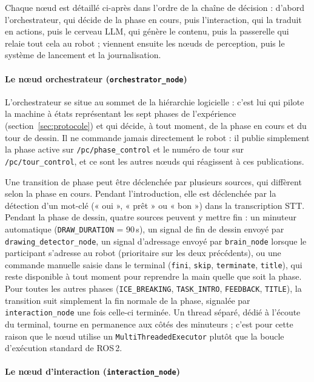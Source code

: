 \documentclass[11pt]{article}
\begin{document}
Chaque nœud est détaillé ci-après dans l'ordre de la chaîne de décision : d'abord l'orchestrateur, qui décide de la phase en cours, puis l'interaction, qui la traduit en actions, puis le cerveau LLM, qui génère le contenu, puis la passerelle qui relaie tout cela au robot ; viennent ensuite les nœuds de perception, puis le système de lancement et la journalisation.

\paragraph{Le nœud orchestrateur (\texttt{orchestrator\_node})}

L'orchestrateur se situe au sommet de la hiérarchie logicielle : c'est lui qui pilote la machine à états représentant les sept phases de l'expérience (section~\ref{sec:protocole}) et qui décide, à tout moment, de la phase en cours et du tour de dessin. Il ne commande jamais directement le robot : il publie simplement la phase active sur \texttt{/pc/phase\_control} et le numéro de tour sur \texttt{/pc/tour\_control}, et ce sont les autres nœuds qui réagissent à ces publications.

Une transition de phase peut être déclenchée par plusieurs sources, qui diffèrent selon la phase en cours. Pendant l'introduction, elle est déclenchée par la détection d'un mot-clé (« oui », « prêt » ou « bon ») dans la transcription STT. Pendant la phase de dessin, quatre sources peuvent y mettre fin : un minuteur automatique (\texttt{DRAW\_DURATION} = 90\,s), un signal de fin de dessin envoyé par \texttt{drawing\_detector\_node}, un signal d'adressage envoyé par \texttt{brain\_node} lorsque le participant s'adresse au robot (prioritaire sur les deux précédents), ou une commande manuelle saisie dans le terminal (\texttt{fini}, \texttt{skip}, \texttt{terminate}, \texttt{title}), qui reste disponible à tout moment pour reprendre la main quelle que soit la phase. Pour toutes les autres phases (\texttt{ICE\_BREAKING}, \texttt{TASK\_INTRO}, \texttt{FEEDBACK}, \texttt{TITLE}), la transition suit simplement la fin normale de la phase, signalée par \texttt{interaction\_node} une fois celle-ci terminée. Un thread séparé, dédié à l'écoute du terminal, tourne en permanence aux côtés des minuteurs ; c'est pour cette raison que le nœud utilise un \texttt{MultiThreadedExecutor} plutôt que la boucle d'exécution standard de ROS\,2.

\paragraph{Le nœud d'interaction (\texttt{interaction\_node})}
\end{document}
